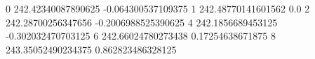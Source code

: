 0 242.42340087890625 -0.064300537109375
1 242.48770141601562 0.0
2 242.28700256347656 -0.2006988525390625
4 242.1856689453125 -0.302032470703125
6 242.66024780273438 0.17254638671875
8 243.35052490234375 0.862823486328125
